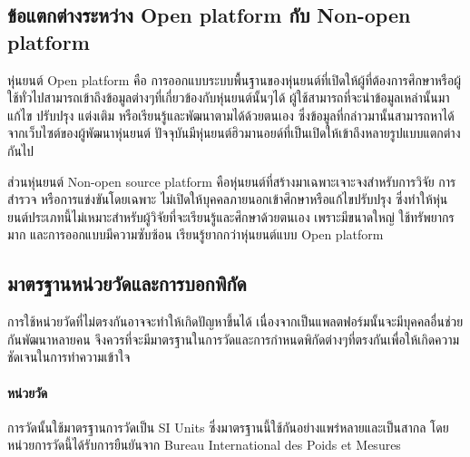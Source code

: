 \subsection{ข้อแตกต่างระหว่าง Open platform กับ Non-open platform}
หุ่นยนต์ Open platform คือ การออกแบบระบบพื้นฐานของหุ่นยนต์ที่เปิดให้ผู้ที่ต้องการศึกษาหรือผู้ใช้ทั่วไปสามารถเข้าถึงข้อมูลต่างๆที่เกี่ยวข้องกับหุ่นยนต์นั้นๆได้
ผู้ใช้สามารถที่จะนำข้อมูลเหล่านั้นมาแก้ไข ปรับปรุง แต่งเติม หรือเรียนรู้และพัฒนาตามได้ด้วยตนเอง 
ซึ่งข้อมูลที่กล่าวมานั้นสามารถหาได้จากเว็บไซต์ของผู้พัฒนาหุ่นยนต์ ปัจจุบันมีหุ่นยนต์ฮิวมานอยด์ที่เป็นเปิดให้เข้าถึงหลายรูปแบบแตกต่างกันไป

ส่วนหุ่นยนต์ Non-open source platform คือหุ่นยนต์ที่สร้างมาเฉพาะเจาะจงสำหรับการวิจัย การสำรวจ หรือการแข่งขันโดยเฉพาะ
ไม่เปิดให้บุคคลภายนอกเข้าศึกษาหรือแก้ไขปรับปรุง ซึ่งทำให้หุ่นยนต์ประเภทนี้ไม่เหมาะสำหรับผู้วิจัยที่จะเรียนรู้และศึกษาด้วยตนเอง เพราะมีขนาดใหญ่
ใช้ทรัพยากรมาก และการออกแบบมีความซับซ้อน เรียนรู้ยากกว่าหุ่นยนต์แบบ Open platform

\subsection{มาตรฐานหน่วยวัดและการบอกพิกัด}
การใช้หน่วยวัดที่ไม่ตรงกันอาจจะทำให้เกิดปัญหาขึ้นได้ เนื่องจากเป็นแพลตฟอร์มนั้นจะมีบุคคลอื่นช่วยกันพัฒนาหลายคน
จึงควรที่จะมีมาตรฐานในการวัดและการกำหนดพิกัดต่างๆที่ตรงกันเพื่อให้เกิดความชัดเจนในการทำความเข้าใจ

\paragraph*{หน่วยวัด}
การวัดนั้นใช้มาตรฐานการวัดเป็น SI Units ซึ่งมาตรฐานนี้ใช้กันอย่างแพร่หลายและเป็นสากล โดยหน่วยการวัดนี้ได้รับการยืนยันจาก
Bureau International des Poids et Mesures


